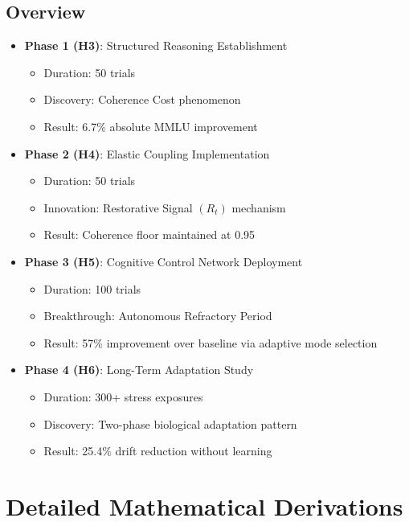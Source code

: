 \documentclass[12pt,a4paper]{report}
\begin{document}
\section{Overview}

\begin{itemize}
\item \textbf{Phase 1 (H3)}: Structured Reasoning Establishment
  \begin{itemize}
  \item Duration: 50 trials
  \item Discovery: Coherence Cost phenomenon
  \item Result: 6.7\% absolute MMLU improvement
  \end{itemize}

\item \textbf{Phase 2 (H4)}: Elastic Coupling Implementation
  \begin{itemize}
  \item Duration: 50 trials
  \item Innovation: Restorative Signal $(R_t)$ mechanism
  \item Result: Coherence floor maintained at 0.95
  \end{itemize}

\item \textbf{Phase 3 (H5)}: Cognitive Control Network Deployment
  \begin{itemize}
  \item Duration: 100 trials
  \item Breakthrough: Autonomous Refractory Period
  \item Result: 57\% improvement over baseline via adaptive mode selection
  \end{itemize}

\item \textbf{Phase 4 (H6)}: Long-Term Adaptation Study
  \begin{itemize}
  \item Duration: 300+ stress exposures
  \item Discovery: Two-phase biological adaptation pattern
  \item Result: 25.4\% drift reduction without learning
  \end{itemize}
\end{itemize}

\chapter{Detailed Mathematical Derivations}
\end{document}
